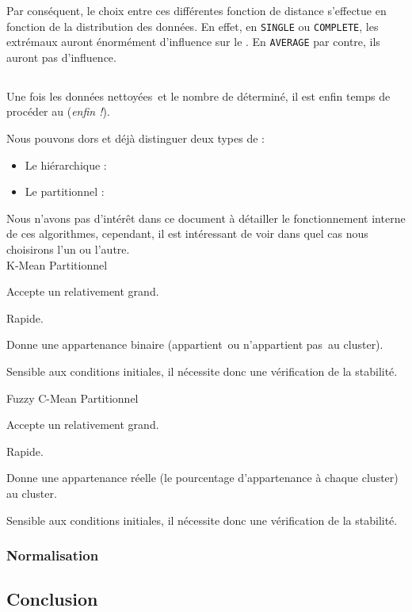 Par conséquent, le choix entre ces différentes fonction de distance s'effectue en fonction de la distribution des données. En effet, en \texttt{SINGLE} ou \texttt{COMPLETE}, les extrémaux auront énormément d'influence sur le . En \texttt{AVERAGE} par contre, ils auront \apriori pas d'influence.

\subsection{}
Une fois les données \og nettoyées\fg~et le nombre de  déterminé, il est enfin temps de procéder au  (\textsl{enfin !}).

Nous pouvons dors et déjà distinguer deux types de  :
\begin{itemize}
	\item Le  hiérarchique :
	\item Le  partitionnel :
\end{itemize}

Nous n'avons pas d'intérêt dans ce document à détailler le fonctionnement interne de ces algorithmes, cependant, il est intéressant de voir dans quel cas nous choisirons l'un ou l'autre.\\

\clusterAlgorithm
{K-Mean}
{Partitionnel}
{
	\item Accepte un  relativement grand.
	\item Rapide.
	\item Donne une appartenance binaire (\ie \og appartient\fg~ou \og n'appartient pas\fg~au cluster).
}
{
	\item Sensible aux conditions initiales, il nécessite donc une vérification de la stabilité.
}

\clusterAlgorithm
{Fuzzy C-Mean}
{Partitionnel}
{
	\item Accepte un  relativement grand.
	\item Rapide.
	\item Donne une appartenance réelle (\ie le pourcentage d'appartenance à chaque cluster) au cluster.
}
{
	\item Sensible aux conditions initiales, il nécessite donc une vérification de la stabilité.
}

\subsubsection{Normalisation}


\subsection{Conclusion}

